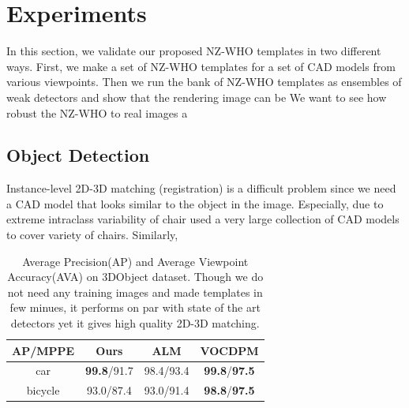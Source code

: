 \documentclass[10pt,twocolumn,letterpaper]{article}
\begin{document}
\section{Experiments}

In this section, we validate our proposed NZ-WHO templates in two different ways. First, we make a set of NZ-WHO templates for a set of CAD models from various viewpoints. Then we run the bank of NZ-WHO templates as ensembles of weak detectors and show that the rendering image can be We want to see how robust the NZ-WHO to real images a

\subsection{Object Detection} 
Instance-level 2D-3D matching (registration) is a difficult problem since we need a CAD model that looks similar to the object in the image. Especially, due to extreme intraclass variability of chair \cite{Aubry14} used a very large collection of CAD models to cover variety of chairs. Similarly, \cite{Lim14}
\begin{table}[!htbp]
  \begin{center}
    \begin{tabular}{|c|c|c|c|}
    \hline
     AP/MPPE& Ours & ALM\cite{Xiang12} & VOCDPM\cite{Pepik12} \\
    \hline\hline
    car & \textbf{99.8}/91.7 &  98.4/93.4 & \textbf{99.8}/\textbf{97.5} \\ 
    bicycle & 93.0/87.4 & 93.0/91.4 & \textbf{98.8}/\textbf{97.5} \\
    \hline
    \end{tabular}
  \end{center}
  \caption{Average Precision(AP) and Average Viewpoint Accuracy(AVA) on 3DObject dataset. Though we do not need any training images and made templates in few minues, it performs on par with state of the art detectors yet it gives high quality 2D-3D matching.}
  \label{tab:3dobject}
\end{table}
\end{document}

